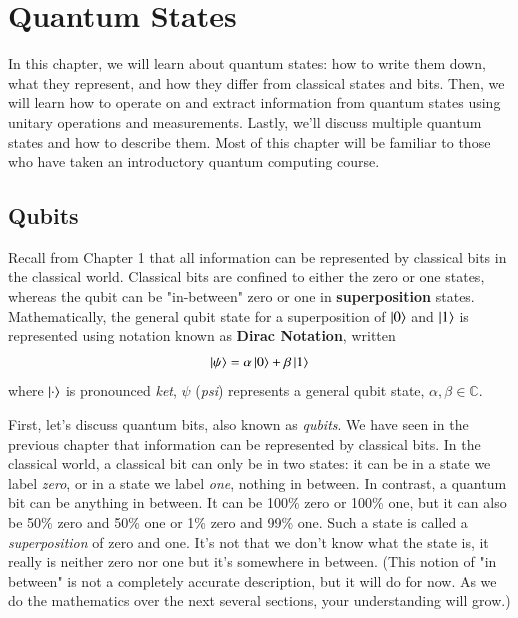 \chapter[Quantum States]{Quantum States}
\label{sec:2_quantum_states}





In this chapter, we will learn about quantum states: how to write them down, what they represent, and how they differ from classical states and bits.
Then, we will learn how to operate on and extract information from quantum states using unitary operations and measurements. Lastly, we'll discuss multiple quantum states and how to describe them.  Most of this chapter will be familiar to those who have taken an introductory quantum computing course.

\section{Qubits}



Recall from Chapter 1 that all information can be represented by classical bits in the classical world. Classical bits are confined to either the zero or one states, whereas the qubit can be "in-between" zero or one in  \textbf{superposition} states. Mathematically, the general qubit state for a superposition of $\left| 0 \right\rangle$ and $\left| 1 \right\rangle$ is represented using notation known as \textbf{Dirac Notation}, written
\begin{equation}
\left| \psi \right\rangle = \alpha \left| 0 \right\rangle + \beta\left| 1 \right\rangle 
\end{equation}
 where $\left| \cdot \right\rangle$ is pronounced \emph{ket}, $\psi$ (\emph{psi}) represents a general qubit state, $\alpha,\beta \in \mathbb{C}$.\label{def:ket}




First, let's discuss quantum bits, also known as \emph{qubits}. We have seen in the previous chapter that information can be represented by classical bits. In the classical world, a classical bit can only be in two states: it can be in a state we label \emph{zero}, or in a state we label \emph{one}, nothing in between. In contrast, a quantum bit can be anything in between. It can be 100\% zero or 100\% one, but it can also be 50\% zero and 50\% one or 1\% zero and 99\% one. Such a state is called a \emph{superposition} of zero and one. It's not that we don't know what the state is, it really is neither zero nor one but it's somewhere in between. (This notion of "in between" is not a completely accurate description, but it will do for now.  As we do the mathematics over the next several sections, your understanding will grow.)

